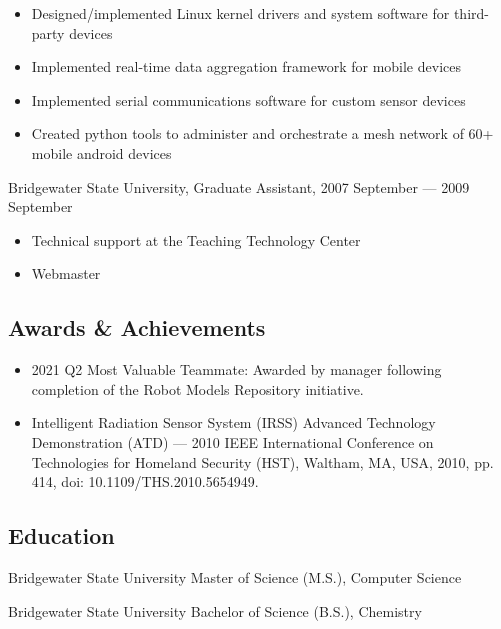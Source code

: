 \documentclass[letterpaper,11pt]{article}
\begin{document}
\begin{itemize}
\item Designed/implemented Linux kernel drivers and system software for
  third-party devices
\item Implemented real-time data aggregation framework for mobile devices
\item Implemented serial communications software for custom sensor devices
\item Created python tools to administer and orchestrate a mesh network of 60+
  mobile android devices
\end{itemize}

Bridgewater State University, Graduate Assistant, 2007 September --- 2009 September

\begin{itemize}
\item Technical support at the Teaching Technology Center
\item Webmaster
\end{itemize}

\subsection*{Awards \& Achievements}

\begin{itemize}
\item 2021 Q2 Most Valuable Teammate: Awarded by manager following completion
  of the Robot Models Repository initiative.
\item Intelligent Radiation Sensor System (IRSS) Advanced Technology
  Demonstration (ATD) --- 2010 IEEE International Conference on Technologies
  for Homeland Security (HST), Waltham, MA, USA, 2010, pp. 414, doi:
  10.1109/THS.2010.5654949.
\end{itemize}

\subsection*{Education}

Bridgewater State University
Master of Science (M.S.), Computer Science

Bridgewater State University
Bachelor of Science (B.S.), Chemistry
\end{document}
